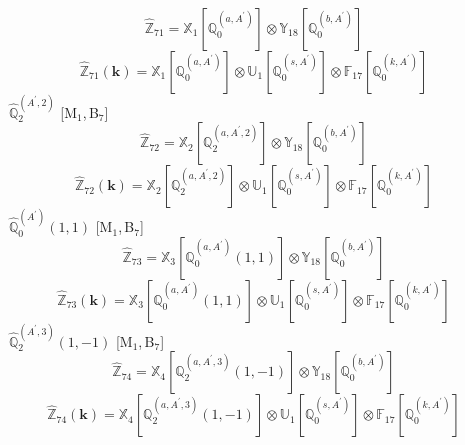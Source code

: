 \documentclass[fleqn,10pt,landscape]{article}
\begin{document}
\begin{itemize}
\begin{dmath*}
\hat{\mathbb{Z}}_{71}=\mathbb{X}_{1}[\mathbb{Q}_{0}^{(a,A^{\prime})}] \otimes\mathbb{Y}_{18}[\mathbb{Q}_{0}^{(b,A^{\prime})}]
\end{dmath*}
\begin{dmath*}
\hat{\mathbb{Z}}_{71}(\bm{k})=\mathbb{X}_{1}[\mathbb{Q}_{0}^{(a,A^{\prime})}] \otimes\mathbb{U}_{1}[\mathbb{Q}_{0}^{(s,A^{\prime})}] \otimes\mathbb{F}_{17}[\mathbb{Q}_{0}^{(k,A^{\prime})}]
\end{dmath*}
\vspace{4mm}
\noindent {} $\,\,\,\hat{\mathbb{Q}}_{2}^{(A^{\prime},2)}$ [M$_{1}$,\,B$_{7}$]
\begin{dmath*}
\hat{\mathbb{Z}}_{72}=\mathbb{X}_{2}[\mathbb{Q}_{2}^{(a,A^{\prime},2)}] \otimes\mathbb{Y}_{18}[\mathbb{Q}_{0}^{(b,A^{\prime})}]
\end{dmath*}
\begin{dmath*}
\hat{\mathbb{Z}}_{72}(\bm{k})=\mathbb{X}_{2}[\mathbb{Q}_{2}^{(a,A^{\prime},2)}] \otimes\mathbb{U}_{1}[\mathbb{Q}_{0}^{(s,A^{\prime})}] \otimes\mathbb{F}_{17}[\mathbb{Q}_{0}^{(k,A^{\prime})}]
\end{dmath*}
\vspace{4mm}
\noindent {} $\,\,\,\hat{\mathbb{Q}}_{0}^{(A^{\prime})}(1,1)$ [M$_{1}$,\,B$_{7}$]
\begin{dmath*}
\hat{\mathbb{Z}}_{73}=\mathbb{X}_{3}[\mathbb{Q}_{0}^{(a,A^{\prime})}(1,1)] \otimes\mathbb{Y}_{18}[\mathbb{Q}_{0}^{(b,A^{\prime})}]
\end{dmath*}
\begin{dmath*}
\hat{\mathbb{Z}}_{73}(\bm{k})=\mathbb{X}_{3}[\mathbb{Q}_{0}^{(a,A^{\prime})}(1,1)] \otimes\mathbb{U}_{1}[\mathbb{Q}_{0}^{(s,A^{\prime})}] \otimes\mathbb{F}_{17}[\mathbb{Q}_{0}^{(k,A^{\prime})}]
\end{dmath*}
\vspace{4mm}
\noindent {} $\,\,\,\hat{\mathbb{Q}}_{2}^{(A^{\prime},3)}(1,-1)$ [M$_{1}$,\,B$_{7}$]
\begin{dmath*}
\hat{\mathbb{Z}}_{74}=\mathbb{X}_{4}[\mathbb{Q}_{2}^{(a,A^{\prime},3)}(1,-1)] \otimes\mathbb{Y}_{18}[\mathbb{Q}_{0}^{(b,A^{\prime})}]
\end{dmath*}
\begin{dmath*}
\hat{\mathbb{Z}}_{74}(\bm{k})=\mathbb{X}_{4}[\mathbb{Q}_{2}^{(a,A^{\prime},3)}(1,-1)] \otimes\mathbb{U}_{1}[\mathbb{Q}_{0}^{(s,A^{\prime})}] \otimes\mathbb{F}_{17}[\mathbb{Q}_{0}^{(k,A^{\prime})}]
\end{dmath*}
\vspace{4mm}

\end{itemize}
\end{document}
